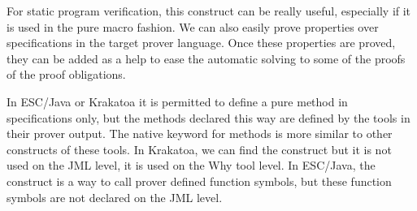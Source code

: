 For static program verification, this construct can be really useful, 
especially if it is used in the pure macro fashion. 
We can also easily prove properties over specifications in the target prover language. 
Once these properties are proved, they can be added as a help
to ease the automatic solving to some of the proofs of the proof obligations.

In  ESC/Java or Krakatoa it is permitted to define a pure method in
specifications only, but the methods declared this way are defined by the 
tools in their prover output. The native keyword for methods is more 
similar to other constructs of these tools.
In Krakatoa, we can find 
the  construct  but it is not used on the JML level, it is used on the
 Why tool \cite{Why-Tool} level. 
In ESC/Java, the  construct 
is a way to call prover defined function symbols, but these function symbols are not declared 
on the JML level.



